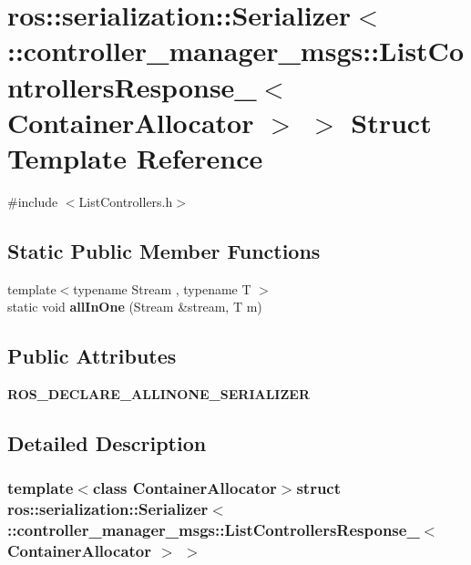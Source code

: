 \section{ros\-:\-:serialization\-:\-:\-Serializer$<$ \-:\-:controller\-\_\-manager\-\_\-msgs\-:\-:\-List\-Controllers\-Response\-\_\-$<$ \-Container\-Allocator $>$ $>$ \-Struct \-Template \-Reference}
\label{structros_1_1serialization_1_1Serializer_3_01_1_1controller__manager__msgs_1_1ListControllersRes9a596dc63f34a72109819bdf9eaad296}


{\ttfamily \#include $<$\-List\-Controllers.\-h$>$}

\subsection*{\-Static \-Public \-Member \-Functions}
\begin{DoxyCompactItemize}
\item 
{\footnotesize template$<$typename Stream , typename T $>$ }\\static void {\bf all\-In\-One} (\-Stream \&stream, \-T m)
\end{DoxyCompactItemize}
\subsection*{\-Public \-Attributes}
\begin{DoxyCompactItemize}
\item 
{\bf \-R\-O\-S\-\_\-\-D\-E\-C\-L\-A\-R\-E\-\_\-\-A\-L\-L\-I\-N\-O\-N\-E\-\_\-\-S\-E\-R\-I\-A\-L\-I\-Z\-E\-R}
\end{DoxyCompactItemize}


\subsection{\-Detailed \-Description}
\subsubsection*{template$<$class Container\-Allocator$>$struct ros\-::serialization\-::\-Serializer$<$ \-::controller\-\_\-manager\-\_\-msgs\-::\-List\-Controllers\-Response\-\_\-$<$ Container\-Allocator $>$ $>$}



